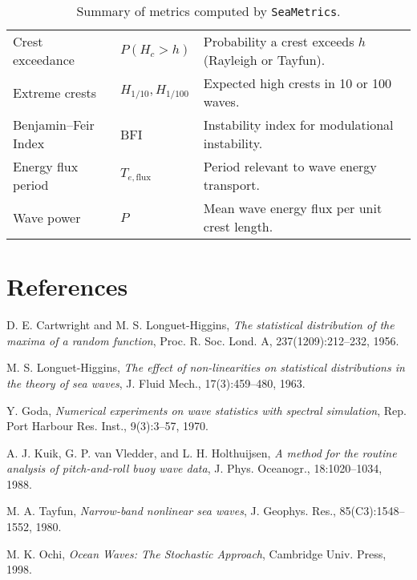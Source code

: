 \documentclass[11pt]{article}
\begin{document}
\begin{table}[h!]
\begin{tabular}{|l|l|p{8cm}|}
\hline
Crest exceedance & $P(H_c>h)$ & Probability a crest exceeds $h$ (Rayleigh or Tayfun). \\
Extreme crests & $H_{1/10}, H_{1/100}$ & Expected high crests in 10 or 100 waves. \\
Benjamin–Feir Index & BFI & Instability index for modulational instability. \\
\hline
Energy flux period & $T_{e,\text{flux}}$ & Period relevant to wave energy transport. \\
Wave power & $P$ & Mean wave energy flux per unit crest length. \\
\hline
\end{tabular}
\caption{Summary of metrics computed by \texttt{SeaMetrics}.}
\label{tab:metrics}
\end{table}

\section{References}

\begin{thebibliography}{9}
D. E. Cartwright and M. S. Longuet-Higgins,
\textit{The statistical distribution of the maxima of a random function},
Proc. R. Soc. Lond. A, 237(1209):212–232, 1956.

M. S. Longuet-Higgins,
\textit{The effect of non-linearities on statistical distributions in the theory of sea waves},
J. Fluid Mech., 17(3):459–480, 1963.

Y. Goda,
\textit{Numerical experiments on wave statistics with spectral simulation},
Rep. Port Harbour Res. Inst., 9(3):3–57, 1970.

A. J. Kuik, G. P. van Vledder, and L. H. Holthuijsen,
\textit{A method for the routine analysis of pitch-and-roll buoy wave data},
J. Phys. Oceanogr., 18:1020–1034, 1988.

M. A. Tayfun,
\textit{Narrow-band nonlinear sea waves},
J. Geophys. Res., 85(C3):1548–1552, 1980.

M. K. Ochi,
\textit{Ocean Waves: The Stochastic Approach},
Cambridge Univ. Press, 1998.
\end{thebibliography}
\end{document}
